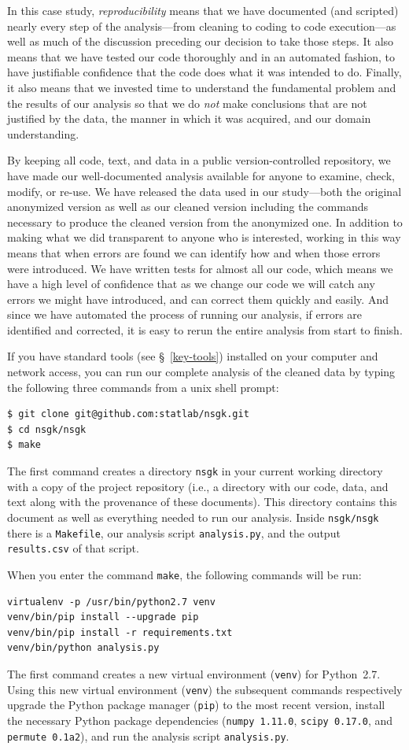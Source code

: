 \documentclass[]{article}
\begin{document}
In this case study, \emph{reproducibility} means that we have documented 
(and scripted) nearly
every step of the analysis---from cleaning to coding to code execution---as
well as much of the discussion preceding our decision to take those steps.
It also means that we have tested our code thoroughly and in an automated fashion, 
to have justifiable confidence that the code does what it was intended
to do.
Finally, it also means that we invested time to understand the fundamental
problem and the results of our analysis so that we do \emph{not} make
conclusions that are not justified by the data, the manner in which it was
acquired, and our domain understanding.

By keeping all code, text, and data in a public version-controlled repository, 
we have made our well-documented analysis available
for anyone to examine, check, modify, or re-use.
We have released the data used in our study---both the original anonymized
version as well as our cleaned version including the commands necessary
to produce the cleaned version from the anonymized one.
In addition to making what we did transparent to anyone who is interested,
working in this way means that when errors are found we can identify
how and when those errors were introduced.
We have written tests for almost all our code, which means we have a high
level of confidence that as we change our code we will catch any errors
we might have introduced, and can correct them quickly and easily.
And since we have automated the process of running our analysis, if errors
are identified and corrected, it is easy to rerun the entire analysis from
start to finish.

If you have standard tools (see \S~\ref{key-tools}) installed on your
computer and network access, you can run our complete analysis of the cleaned
data by typing the following three commands from a unix shell prompt:
\begin{verbatim}
$ git clone git@github.com:statlab/nsgk.git
$ cd nsgk/nsgk
$ make
\end{verbatim}
The first command creates a directory \texttt{nsgk} in your current working
directory with a copy of the project repository (i.e., a directory with our
code, data, and text along with the provenance of these documents).
This directory contains this document as well as everything needed to run our
analysis.
Inside \texttt{nsgk/nsgk} there is a \texttt{Makefile}, our analysis script
\texttt{analysis.py}, and the output \texttt{results.csv} of that script.

When you enter the command \texttt{make}, the following commands will be run:
\begin{verbatim}
virtualenv -p /usr/bin/python2.7 venv
venv/bin/pip install --upgrade pip
venv/bin/pip install -r requirements.txt
venv/bin/python analysis.py
\end{verbatim}
The first command creates a new virtual environment (\texttt{venv}) for Python~2.7.
Using this new virtual environment (\texttt{venv}) the subsequent commands
respectively upgrade the Python package manager (\texttt{pip}) to the most
recent version, install the necessary Python package dependencies
(\texttt{numpy~1.11.0}, \texttt{scipy~0.17.0}, and \texttt{permute~0.1a2}),
and run the analysis script \texttt{analysis.py}.
\end{document}
